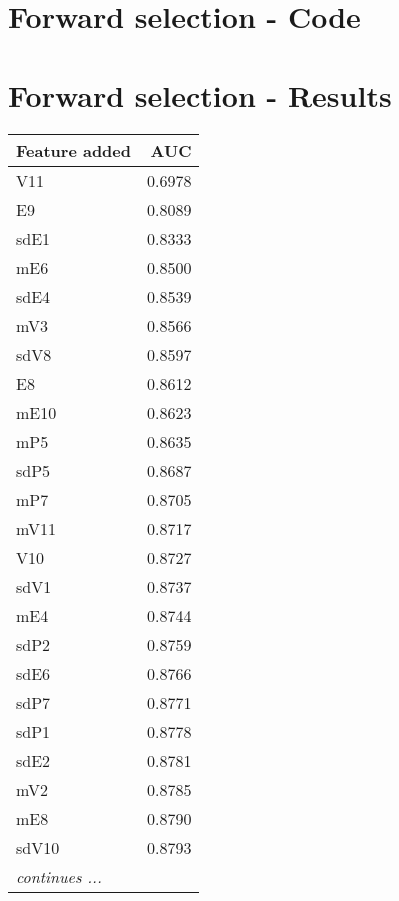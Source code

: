 \section{Forward selection - Code} %
\label{app:source-forward-selection}

\section{Forward selection - Results} %
\label{app:result-forward-selection}
{\small\sffamily\centering
\begin{minipage}[t]{40mm}
\vspace{0pt}
\begin{tabularx}{40mm}{ l R }
Feature added & AUC \\\hline
V11 & 0.6978 \\
E9 & 0.8089 \\
sdE1 & 0.8333 \\
mE6 & 0.8500 \\
sdE4 & 0.8539 \\
mV3 & 0.8566 \\
sdV8 & 0.8597 \\
E8 & 0.8612 \\
mE10 & 0.8623 \\
mP5 & 0.8635 \\
sdP5 & 0.8687 \\
mP7 & 0.8705 \\
mV11 & 0.8717 \\
V10 & 0.8727 \\
sdV1 & 0.8737 \\
mE4 & 0.8744 \\
sdP2 & 0.8759 \\
sdE6 & 0.8766 \\
sdP7 & 0.8771 \\
sdP1 & 0.8778 \\
sdE2 & 0.8781 \\
mV2 & 0.8785 \\
mE8 & 0.8790 \\
sdV10 & 0.8793 \\
{\itshape continues ...} & 
\end{tabularx}
\end{minipage}
\hspace{35mm}
\begin{minipage}[t]{40mm}
\vspace{0pt}
\begin{tabularx}{40mm}{ l R }

\end{tabularx}
\end{minipage}}
